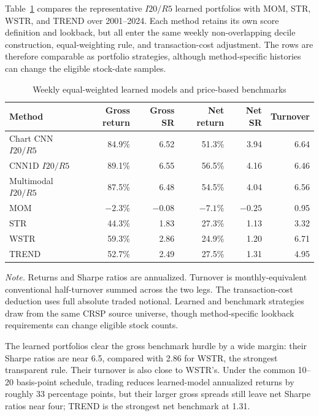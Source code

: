 Table~\ref{tab:weekly_benchmarks} compares the representative $I20/R5$ learned portfolios with MOM, STR, WSTR, and TREND over 2001--2024. Each method retains its own score definition and lookback, but all enter the same weekly non-overlapping decile construction, equal-weighting rule, and transaction-cost adjustment. The rows are therefore comparable as portfolio strategies, although method-specific histories can change the eligible stock-date samples.

\begin{table}[htbp]
\centering
\caption{Weekly equal-weighted learned models and price-based benchmarks}
\label{tab:weekly_benchmarks}
\small
\setlength{\tabcolsep}{6pt}
\begin{tabular}{@{}lrrrrr@{}}
\toprule
Method & Gross return & Gross SR & Net return & Net SR & Turnover \\
\midrule
Chart CNN $I20/R5$ & 84.9\% & 6.52 & 51.3\% & 3.94 & 6.64 \\
CNN1D $I20/R5$ & 89.1\% & 6.55 & 56.5\% & 4.16 & 6.46 \\
Multimodal $I20/R5$ & 87.5\% & 6.48 & 54.5\% & 4.04 & 6.56 \\
MOM & $-2.3$\% & $-0.08$ & $-7.1$\% & $-0.25$ & 0.95 \\
STR & 44.3\% & 1.83 & 27.3\% & 1.13 & 3.32 \\
WSTR & 59.3\% & 2.86 & 24.9\% & 1.20 & 6.71 \\
TREND & 52.7\% & 2.49 & 27.5\% & 1.31 & 4.95 \\
\bottomrule
\end{tabular}
\begin{minipage}{\textwidth}
\footnotesize\textit{Note.} Returns and Sharpe ratios are annualized. Turnover is monthly-equivalent conventional half-turnover summed across the two legs. The transaction-cost deduction uses full absolute traded notional. Learned and benchmark strategies draw from the same CRSP source universe, though method-specific lookback requirements can change eligible stock counts.
\end{minipage}
\end{table}

The learned portfolios clear the gross benchmark hurdle by a wide margin: their Sharpe ratios are near 6.5, compared with 2.86 for WSTR, the strongest transparent rule. Their turnover is also close to WSTR's. Under the common 10--20 basis-point schedule, trading reduces learned-model annualized returns by roughly 33 percentage points, but their larger gross spreads still leave net Sharpe ratios near four; TREND is the strongest net benchmark at 1.31.

